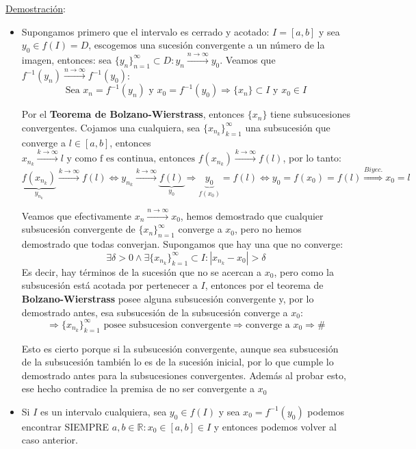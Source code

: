 \documentclass[10pt,a4paper,openright]{book}
\begin{document}
\underline{Demostración}:
\begin{itemize}
\item Supongamos primero que el intervalo es cerrado y acotado: $I=[a,b]$ y sea $y_0\in f(I)=D$, escogemos una sucesión convergente a un número de la imagen, entonces: sea $\{y_n\}_{n=1}^\infty \subset D: y_n\xrightarrow{n\rightarrow \infty} y_0$. Veamos que $f^{-1}(y_n)\xrightarrow{n\rightarrow\infty} f^{-1}(y_0)$:
$$\mbox{Sea }x_n=f^{-1}(y_n)\mbox{ y }x_0=f^{-1}(y_0)\Rightarrow \{x_n\}\subset I\mbox{ y }x_0\in I$$

Por el \textbf{Teorema de Bolzano-Wierstrass}, entonces $\{x_n\}$ tiene subsucesiones convergentes. Cojamos una cualquiera, sea $\{x_{n_k}\}_{k=1}^\infty$ una subsucesión que converge a $l\in [a,b]$, entonces $x_{n_k}\xrightarrow{k\rightarrow \infty }l\mbox{ y como f es continua, entonces } f(x_{n_k})\xrightarrow{k\rightarrow \infty}f(l)$, por lo tanto:
$$\underbrace{f(x_{n_k})}_{y_{n_k}}\xrightarrow{k\rightarrow \infty}f(l)\Leftrightarrow y_{n_k}\xrightarrow{k\rightarrow \infty}\underbrace{f(l)}_{y_0}\Rightarrow \underbrace{y_0}_{f(x_0)}=f(l)\Leftrightarrow y_0=f(x_0)=f(l)\stackrel{Biyec.}{\Rightarrow}x_0=l$$

Veamos que efectivamente $x_n\xrightarrow{n\rightarrow\infty}x_0$, hemos demostrado que cualquier subsucesión convergente de $\{x_n\}_{n=1}^\infty$ converge a $x_0$, pero no hemos demostrado que todas converjan. Supongamos que hay una que no converge:
$$\exists \delta>0 \wedge \exists \{x_{n_k}\}_{k=1}^\infty\subset I: |x_{n_k}-x_0|>\delta$$
Es decir, hay términos de la sucesión que no se acercan a $x_0$, pero como la subsucesión está acotada por pertenecer a $I$, entonces por el teorema de \textbf{Bolzano-Wierstrass} posee alguna subsucesión convergente y, por lo demostrado antes, esa subsucesión de la subsucesión converge a $x_0$:
$$\Rightarrow \{x_{n_k}\}_{k=1}^\infty\mbox{ posee subsucesion convergente}\Rightarrow \mbox{converge a }x_0\Rightarrow \#$$

Esto es cierto porque si la subsucesión convergente, aunque sea subsucesión de la subsucesión también lo es de la sucesión inicial, por lo que cumple lo demostrado antes para la subsucesiones convergentes. Además al probar esto, ese hecho contradice la premisa de no ser convergente a $x_0$

\item Si $I$ es un intervalo cualquiera, sea $y_0\in f(I)$ y sea $x_0=f^{-1}(y_0)$ podemos encontrar SIEMPRE $a,b\in \mathbb R: x_0\in [a,b]\in I$ y entonces podemos volver al caso anterior.
\end{itemize}
\end{document}
